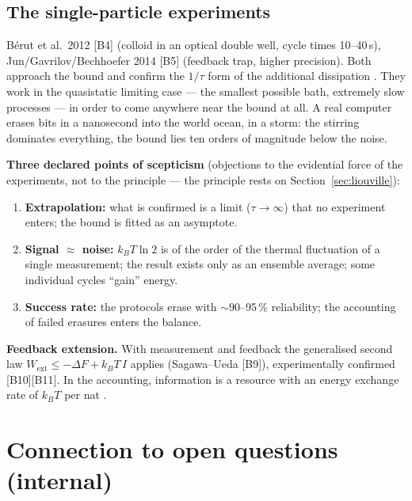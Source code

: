 \subsection{The single-particle experiments}

Bérut et al.\ 2012 [B4] (colloid in an optical double well, cycle times
10--40\,s), Jun/Gavrilov/Bechhoefer 2014 [B5] (feedback trap, higher precision).
Both approach the bound and confirm the $1/\tau$ form of the additional
dissipation . They work in the quasistatic limiting case --- the
smallest possible bath, extremely slow processes --- in order to come anywhere near
the bound at all. A real computer erases bits in a nanosecond into the world ocean,
in a storm: the stirring dominates everything, the bound lies ten orders of
magnitude below the noise.

\textbf{Three declared points of scepticism} (objections to the evidential force
of the experiments, not to the principle --- the principle rests on
Section~\ref{sec:liouville}):

\begin{enumerate}[leftmargin=1.6em,itemsep=0.25em]
  \item \textbf{Extrapolation:} what is confirmed is a limit ($\tau\to\infty$)
        that no experiment enters; the bound is fitted as an asymptote.
  \item \textbf{Signal $\approx$ noise:} $k_B T \ln 2$ is of the order of the
        thermal fluctuation of a single measurement; the result exists only as an
        ensemble average; some individual cycles “gain” energy.
  \item \textbf{Success rate:} the protocols erase with ${\sim}90$--95\,\%
        reliability; the accounting of failed erasures enters the balance.
\end{enumerate}

\LK \textbf{Feedback extension.} With measurement and feedback the generalised
second law $W_{\text{ext}} \le -\Delta F + k_B T\,I$ applies (Sagawa--Ueda [B9]),
experimentally confirmed [B10][B11]. In the accounting, information is a resource
with an energy exchange rate of $k_B T$ per nat .

\section{Connection to open questions (internal)}

